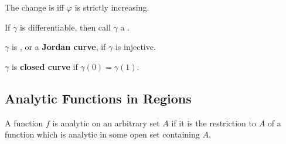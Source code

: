 The change is  iff  $ \varphi  $ is strictly increasing. 

If  $ \gamma  $ is differentiable, then call  $ \gamma  $ a .

 $ \gamma  $ is , or a   \textbf{Jordan curve}, if  $ \gamma $ is injective.
 
  $ \gamma  $ is   \textbf{closed curve} if  $ \gamma(0)=\gamma(1) $.  
\subsection{Analytic Functions in Regions}
A function  $ f  $ is analytic on an arbitrary set  $ A  $ if it is  the restriction to  $ A  $ of a function which is analytic in some open set containing  $ A  $. 